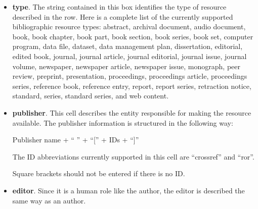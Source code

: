 \documentclass{article}
\begin{document}
\begin{itemize}
  \item \textbf{type}. The string contained in this box identifies the type of resource described in the row. Here is a complete list of the currently supported bibliographic resource types: abstract, archival document, audio document, book, book chapter, book part, book section, book series, book set, computer program, data file, dataset, data management plan, dissertation, editorial, edited book, journal, journal article, journal editorial, journal issue, journal volume, newspaper, newspaper article, newspaper issue, monograph, peer review, preprint, presentation, proceedings, proceedings article, proceedings series, reference book, reference entry, report, report series, retraction notice, standard, series, standard series, and web content.
  \item \textbf{publisher}. This cell describes the entity responsible for making the resource available. The publisher information is structured in the following way:
  \begin{center}Publisher name + `` '' + ``['' + IDs + ``]''\end{center}

  The ID abbreviations currently supported in this cell are ``crossref'' and ``ror''.

  Square brackets should not be entered if there is no ID.
  \item \textbf{editor}. Since it is a human role like the author, the editor is described the same way as an author.
\end{itemize}
\end{document}
